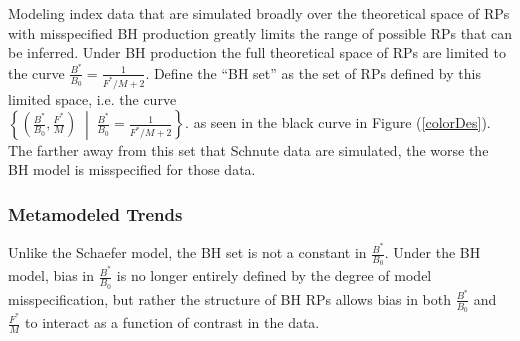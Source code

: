 \documentclass[12pt]{article}
\begin{document}
%
%
%

%
Modeling index data that are simulated broadly over the theoretical space of RPs 
with misspecified BH production greatly limits the range of possible RPs that 
can be inferred. Under BH production the full theoretical space of RPs are 
limited to the curve \mbox{$\frac{B^*}{B_0}=\frac{1}{F^*/M+2}$.} Define the 
``BH set'' as the set of RPs defined by this limited space, i.e. the curve \\
$\left\{\left(\frac{B^*}{B_0}, \frac{F^*}{M}\right) \;\middle|\; \frac{B^*}{B_0}=\frac{1}{F^*/M+2}\right\}$.
as seen in the black curve in Figure (\ref{colorDes}).
The farther away from this set that Schnute data are simulated, the worse the 
BH model is misspecified for those data. 


%
\subsubsection{Metamodeled Trends}


%
Unlike the Schaefer model, the BH set is not a constant in 
$\frac{B^*}{B_0}$. Under the BH model, bias in $\frac{B^*}{B_0}$ is no 
longer entirely defined by the degree of model misspecification, but rather the 
structure of BH RPs allows bias in both $\frac{B^*}{B_0}$ and $\frac{F^*}{M}$ 
to interact as a function of contrast in the data.
\end{document}
